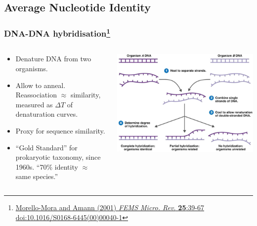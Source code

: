 \subsection{Average Nucleotide Identity}

\begin{frame}
  \frametitle{DNA-DNA hybridisation\footnote{\tiny{\href{http://dx.doi.org/10.1016/S0168-6445(00)00040-1}{Morello-Mora and Amann (2001) \textit{FEMS Micro. Rev.} \textbf{25}:39-67 doi:10.1016/S0168-6445(00)00040-1}}}}
  \begin{columns}[T]
    \begin{column}{5cm}
      \begin{itemize}
        \item Denature DNA from two organisms.
        \item Allow to anneal. Reassociation $\approx$ similarity, measured as $\Delta T$  of denaturation curves.
        \item Proxy for sequence similarity.
        \item ``Gold Standard'' for prokaryotic taxonomy, since 1960s. ``70\% identity $\approx$ same species.''
      \end{itemize}
    \end{column}
    \begin{column}{5cm}
      \includegraphics[width=1\textwidth]{images/ddh}
    \end{column}
  \end{columns}
\end{frame}


